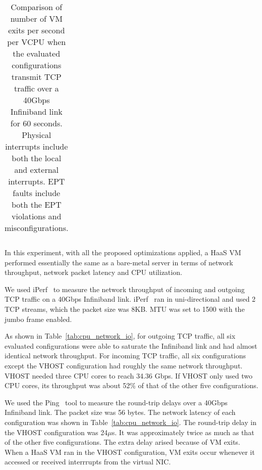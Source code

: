 \begin{table*}[t]
{\begin{tabular}{|l|c|c|c|c|c|c|c|}
\end{tabular}%
}
\caption{Comparison of number of VM exits per second per VCPU
when the evaluated configurations transmit TCP traffic over a
40Gbps Infiniband link for 60 seconds. Physical interrupts
include both the local and external interrupts. EPT faults
include both the EPT violations and misconfigurations.}
\label{tab:vm_exit}
\end{table*}

In this experiment, with all the proposed optimizations
applied, a HaaS VM performed essentially the same as a
bare-metal server in terms of network throughput, network
packet latency and CPU utilization.

We used iPerf~\cite{iperf} to measure the network throughput
of incoming and outgoing TCP traffic on a 40Gbps Infiniband
link. iPerf~\cite{iperf} ran in uni-directional and used 2 TCP
streams, which the packet size was 8KB. MTU was set to 1500
with the jumbo frame enabled.

As shown in Table~\ref{tab:cpu_network_io}, for outgoing TCP
traffic, all six evaluated configurations were able to
saturate the Infiniband link and had almost identical network
throughput. For incoming TCP traffic, all six configurations
except the VHOST configuration had roughly the same network
throughput. VHOST needed three CPU cores to reach 34.36 Gbps.
If VHOST only used two CPU cores, its throughput was about
52\% of that of the other five configurations.

We used the Ping~\cite{ping} tool to measure the round-trip
delays over a 40Gbps Infiniband link. The packet size was 56
bytes. The network latency of each configuration was shown in
Table~\ref{tab:cpu_network_io}. The round-trip delay in the
VHOST configuration was 24$\mu$s. It was approximately twice
as much as that of the other five configurations. The extra
delay arised because of VM exits. When a HaaS VM ran in the
VHOST configuration, VM exits occur whenever it accessed or
received interrrupts from the virtual NIC.

